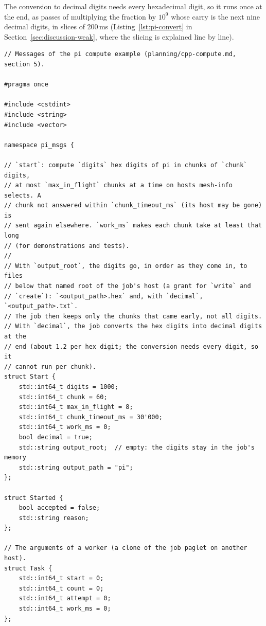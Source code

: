 The conversion to decimal digits needs every hexadecimal digit, so it
runs once at the end, as passes of multiplying the fraction by $10^9$
whose carry is the next nine decimal digits, in slices of 200\,ms
(Listing~\ref{lst:pi-convert} in Section~\ref{sec:discussion-weak},
where the slicing is explained line by line).

\begin{lstlisting}[style=paglets-cpp,caption={Pi's messages: the job's parameters, a worker's task, a result and the status \src{cpp/examples/pi/pi\_msgs.hpp}},label={lst:app-pi-messages}]
// Messages of the pi compute example (planning/cpp-compute.md, section 5).

#pragma once

#include <cstdint>
#include <string>
#include <vector>

namespace pi_msgs {

// `start`: compute `digits` hex digits of pi in chunks of `chunk` digits,
// at most `max_in_flight` chunks at a time on hosts mesh-info selects. A
// chunk not answered within `chunk_timeout_ms` (its host may be gone) is
// sent again elsewhere. `work_ms` makes each chunk take at least that long
// (for demonstrations and tests).
//
// With `output_root`, the digits go, in order as they come in, to files
// below that named root of the job's host (a grant for `write` and
// `create`): `<output_path>.hex` and, with `decimal`, `<output_path>.txt`.
// The job then keeps only the chunks that came early, not all digits.
// With `decimal`, the job converts the hex digits into decimal digits at the
// end (about 1.2 per hex digit; the conversion needs every digit, so it
// cannot run per chunk).
struct Start {
    std::int64_t digits = 1000;
    std::int64_t chunk = 60;
    std::int64_t max_in_flight = 8;
    std::int64_t chunk_timeout_ms = 30'000;
    std::int64_t work_ms = 0;
    bool decimal = true;
    std::string output_root;  // empty: the digits stay in the job's memory
    std::string output_path = "pi";
};

struct Started {
    bool accepted = false;
    std::string reason;
};

// The arguments of a worker (a clone of the job paglet on another host).
struct Task {
    std::int64_t start = 0;
    std::int64_t count = 0;
    std::int64_t attempt = 0;
    std::int64_t work_ms = 0;
};


\end{lstlisting}
